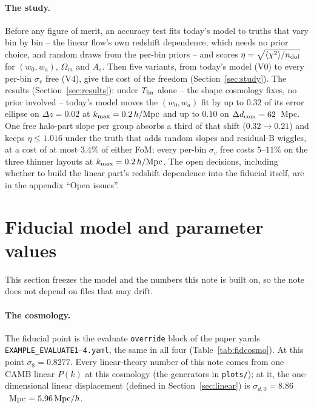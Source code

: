 \documentclass[11pt]{article}
\newcommand{\sv}{\sigma_v}
\newcommand{\hMpc}{\,h/{\rm Mpc}}
\newcommand{\Mpch}{\,{\rm Mpc}/h}
\newcommand{\kmax}{k_{\rm max}}
\newcommand{\dcom}{$\Delta d_{\rm com} = 62$~Mpc}
\newcommand{\chidof}{\sqrt{\langle\chi^2\rangle/n_{\rm dof}}}
\newcommand{\us}{\_\allowbreak}
\begin{document}
\paragraph{The study.}
Before any figure of merit, an accuracy test fits today's model to
truths that vary bin by bin -- the linear flow's own redshift
dependence, which needs no prior choice, and random draws from the
per-bin priors -- and scores
$\eta = \chidof$ for $(w_0, w_a)$, $\Omega_m$ and $A_s$.  Then five
variants, from today's model (V0) to every per-bin $\sv$ free (V4),
give the cost of the freedom (Section~\ref{sec:study}).  The results
(Section~\ref{sec:results}): under $T_{\rm lin}$ alone -- the shape
cosmology fixes, no prior involved -- today's model moves the
$(w_0, w_a)$ fit by up to $0.32$ of its error ellipse on
$\Delta z = 0.02$ at $\kmax = 0.2\hMpc$ and up to $0.10$ on \dcom.
One free halo-part slope per group absorbs a third of that shift
($0.32 \to 0.21$) and keeps $\eta \le 1.016$ under the truth that
adds random slopes and residual-B wiggles,
at a cost of at most $3.4\%$ of either FoM; every per-bin $\sv$ free
costs $5$--$11\%$ on the three thinner layouts at $\kmax = 0.2\hMpc$.
The open decisions, including whether to build the linear part's
redshift dependence into the fiducial itself, are in the appendix
``Open issues''.

\section{Fiducial model and parameter values}
\label{sec:fiducial}

This section freezes the model and the numbers this note is built on,
so the note does not depend on files that may drift.

\paragraph{The cosmology.}
The fiducial point is the evaluate \texttt{override} block of the paper
yamls \texttt{EXAMPLE\us EVALUATE1}--\texttt{4.yaml}, the same in all
four (Table~\ref{tab:fidcosmo}).  At this point $\sigma_8 = 0.8277$.
Every linear-theory number of this note comes from one CAMB linear
$P(k)$ at this cosmology (the generators in \texttt{plots/}); at it,
the one-dimensional linear displacement (defined in
Section~\ref{sec:linear}) is $\sigma_{d,0} = 8.86$~Mpc $= 5.96\Mpch$.
\end{document}

